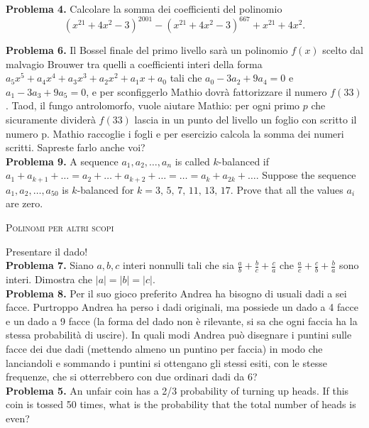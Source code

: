 \documentclass[a4paper]{article}
\theoremstyle{remark}
\theoremstyle{definition}
\begin{document}
\begin{multicols}{2}
	\textbf{Problema 4.} Calcolare la somma dei coefficienti del polinomio
	\[ (x^{21} + 4x^2 - 3)^{2001} - (x^{21} + 4x^2 - 3)^{667} +x^{21} +4x^2. \]
	

	
	\textbf{Problema 6.} Il Bossel finale del primo livello sarà un polinomio $ f (x) $ scelto dal malvagio Brouwer tra quelli a coefficienti interi
	della forma $ a_5x^5 + a_4 x^4 + a_3 x^3 + a_2 x^2 + a_1 x + a_0 $ tali che $ a_0 - 3a_2 + 9a_4 = 0 $ e $ a_1 - 3a_3 + 9a_5 = 0 $, e per sconfiggerlo
	Mathio dovrà fattorizzare il numero $ f (33) $. Taod, il fungo antrolomorfo, vuole aiutare Mathio: per ogni primo $ p $ che
	sicuramente dividerà $ f (33) $ lascia in un punto del livello un foglio con scritto il numero p. Mathio raccoglie i fogli e
	per esercizio calcola la somma dei numeri scritti. Sapreste farlo anche voi? \\
	
	\textbf{Problema 9.} A sequence $ a_1, a_2, \dots, a_n $ is called $ k $-balanced if $ a_1 + a_{k+1} + \dots = a_2 + \dots + a_{k+2} + \dots = \dots = 
	a_k +a_{2k} + \dots $. Suppose the sequence $ a_1, a_2, \dots , a_{50} $ is $ k $-balanced for $ k = 3,\, 5,\, 7,\, 11,\, 13,\, 17 $. Prove
	that all the values $ a_i $ are zero. \\
	
	\begin{center}
		\textsc{Polinomi per altri scopi}
	\end{center}
	
	Presentare il dado! \\
	
	\textbf{Problema 7.} Siano $ a, b, c $ interi nonnulli tali che sia $ \frac{a}{b} +\frac{b}{c}+ \frac{c}{a} $ che $ \frac{a}{c} +\frac{c}{b}+ \frac{b}{a} $ sono interi. Dimostra che $ |a| = |b| = |c| $. \\
	
	\textbf{Problema 8.} Per il suo gioco preferito Andrea ha bisogno di usuali dadi a sei facce. Purtroppo Andrea ha perso i dadi originali, ma possiede un dado a 4 facce e un dado a 9 facce (la forma del dado non è rilevante, si sa che ogni faccia ha la stessa probabilità di uscire). In quali modi Andrea può disegnare i puntini sulle facce dei due dadi (mettendo almeno un puntino per faccia) in modo che lanciandoli e sommando i puntini si ottengano gli stessi esiti, con le stesse frequenze, che si otterrebbero con due ordinari dadi da 6? \\
	
	\textbf{Problema 5.} An unfair coin has a 2/3 probability of turning up heads. If this coin is tossed 50 times, what is the probability that the total number of heads is even? \\

	
\end{multicols}
\end{document}
